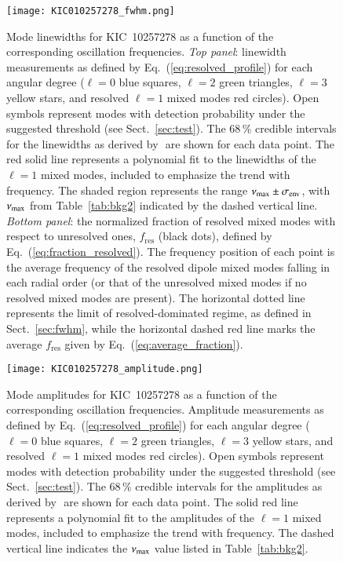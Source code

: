 \begin{figure}
   \centering
   \texttt{[image: KIC010257278\_fwhm.png]}
      \caption{Mode linewidths for KIC~10257278 as a function of the corresponding oscillation frequencies. \textit{Top panel}: linewidth measurements as defined by Eq.~(\ref{eq:resolved_profile}) for each angular degree ($\ell = 0$ blue squares, $\ell = 2$ green triangles, $\ell = 3$ yellow stars, and resolved $\ell = 1$ mixed modes red circles). Open symbols represent modes with detection probability under the suggested threshold (see Sect.~\ref{sec:test}). The 68\,\% credible intervals for the linewidths as derived by \diamonds\,\,are shown for each data point. The red solid line represents a polynomial fit to the linewidths of the $\ell = 1$ mixed modes, included to emphasize the trend with frequency. The shaded region represents the range $\nu_\mathrm{max} \pm \sigma_\mathrm{env}$, with $\nu_\mathrm{max}$ from Table~\ref{tab:bkg2} indicated by the dashed vertical line. \textit{Bottom panel}: the normalized fraction of resolved mixed modes with respect to unresolved ones, $f_\mathrm{res}$ (black dots), defined by Eq.~(\ref{eq:fraction_resolved}). The frequency position of each point is the average frequency of the resolved dipole mixed modes falling in each radial order (or that of the unresolved mixed modes if no resolved mixed modes are present). The horizontal dotted line represents the limit of resolved-dominated regime, as defined in Sect.~\ref{sec:fwhm}, while the horizontal dashed red line marks the average $f_\mathrm{res}$ given by Eq.~(\ref{eq:average_fraction}).}
    \label{fig:10257278fwhm}
\end{figure}


\begin{figure}
   \centering
   \texttt{[image: KIC010257278\_amplitude.png]}
      \caption{Mode amplitudes for KIC~10257278 as a function of the corresponding oscillation frequencies. Amplitude measurements as defined by Eq.~(\ref{eq:resolved_profile}) for each angular degree ($\ell = 0$ blue squares, $\ell = 2$ green triangles, $\ell = 3$ yellow stars, and resolved $\ell = 1$ mixed modes red circles). Open symbols represent modes with detection probability under the suggested threshold (see Sect.~\ref{sec:test}). The 68\,\% credible intervals for the amplitudes as derived by \diamonds\,\,are shown for each data point. The solid red line represents a polynomial fit to the amplitudes of the $\ell = 1$ mixed modes, included to emphasize the trend with frequency. The dashed vertical line indicates the $\nu_\mathrm{max}$ value listed in Table~\ref{tab:bkg2}.}
    \label{fig:10257278amplitude}
\end{figure}
\clearpage


